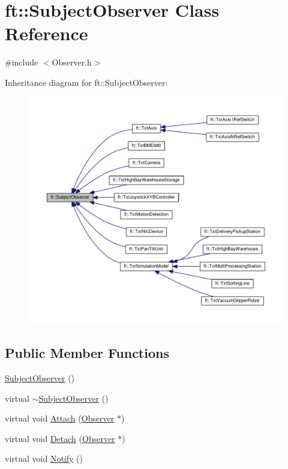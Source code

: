 \hypertarget{classft_1_1_subject_observer}{}\section{ft\+:\+:Subject\+Observer Class Reference}
\label{classft_1_1_subject_observer}


{\ttfamily \#include $<$Observer.\+h$>$}



Inheritance diagram for ft\+:\+:Subject\+Observer\+:
\nopagebreak
\begin{figure}[H]
\begin{center}
\leavevmode
\includegraphics[width=350pt]{classft_1_1_subject_observer__inherit__graph}
\end{center}
\end{figure}
\subsection*{Public Member Functions}
\begin{DoxyCompactItemize}
\item 
\hyperlink{classft_1_1_subject_observer_aac5d28f22abe6a477d5dc3ea3be2b89e}{Subject\+Observer} ()
\item 
virtual \hyperlink{classft_1_1_subject_observer_a19735bd75211a7f2fbd3401e50184667}{$\sim$\+Subject\+Observer} ()
\item 
virtual void \hyperlink{classft_1_1_subject_observer_a94332adb13ba0f1e610287dfbeccc18d}{Attach} (\hyperlink{classft_1_1_observer}{Observer} $\ast$)
\item 
virtual void \hyperlink{classft_1_1_subject_observer_acf9ba0790274c926591f11be33e36ac6}{Detach} (\hyperlink{classft_1_1_observer}{Observer} $\ast$)
\item 
virtual void \hyperlink{classft_1_1_subject_observer_a5a797eb3e2c13bbd3bdf122894bd29e9}{Notify} ()
\end{DoxyCompactItemize}


